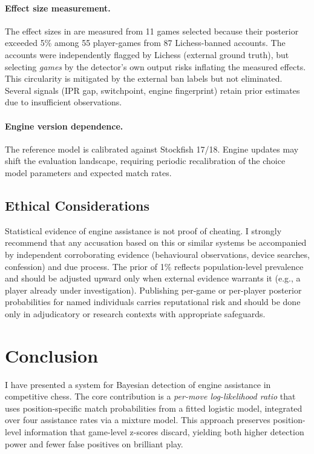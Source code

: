 \documentclass[11pt,a4paper]{article}
\theoremstyle{definition}
\begin{document}
\paragraph{Effect size measurement.}
The effect sizes in  are measured from 11 games
selected because their posterior exceeded 5\% among 55 player-games
from 87 Lichess-banned accounts.  The accounts were independently
flagged by Lichess (external ground truth), but selecting \emph{games}
by the detector's own output risks inflating the measured effects.
This circularity is mitigated by the external ban labels but not
eliminated.  Several signals (IPR gap, switchpoint, engine
fingerprint) retain prior estimates due to insufficient observations.

\paragraph{Engine version dependence.}
The reference model is calibrated against Stockfish 17/18.  Engine
updates may shift the evaluation landscape, requiring periodic
recalibration of the choice model parameters and expected match rates.

\subsection{Ethical Considerations}

Statistical evidence of engine assistance is not proof of cheating.
I strongly recommend that any accusation based on this or similar
systems be accompanied by independent corroborating evidence
(behavioural observations, device searches, confession) and due process.
The prior of 1\% reflects population-level prevalence and should be
adjusted upward only when external evidence warrants it (e.g., a player
already under investigation).  Publishing per-game or per-player
posterior probabilities for named individuals carries reputational risk
and should be done only in adjudicatory or research contexts with
appropriate safeguards.


\section{Conclusion}
\label{sec:conclusion}

I have presented a system for Bayesian detection of engine
assistance in competitive chess.  The core contribution is a
\emph{per-move log-likelihood ratio} that uses position-specific
match probabilities from a fitted logistic model, integrated over four
assistance rates via a mixture model.  This approach preserves
position-level information that game-level z-scores discard, yielding
both higher detection power and fewer false positives on brilliant play.
\end{document}
